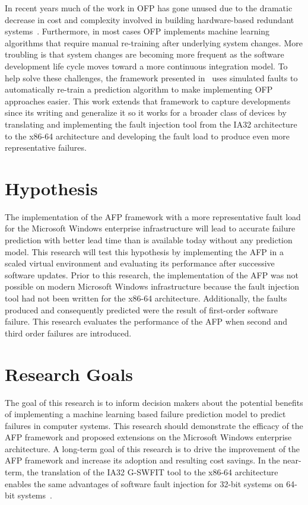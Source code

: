 In recent years much of the work in OFP has gone unused due to the dramatic
decrease in cost and complexity involved in building hardware-based redundant
systems~\cite{irrera2015}.  Furthermore, in most cases OFP implements machine
learning algorithms that require manual re-training after underlying system
changes.  More troubling is that system changes are becoming more frequent as
the software development life cycle moves toward a more continuous integration
model.  To help solve these challenges, the framework presented
in~\cite{irrera2015} uses simulated faults to automatically re-train a
prediction algorithm to make implementing OFP approaches easier.  This work
extends that framework to capture developments since its writing and generalize
it so it works for a broader class of devices by translating and implementing
the fault injection tool from the IA32 architecture to the x86-64 architecture
and developing the fault load to produce even more representative failures.

\section{Hypothesis}
The implementation of the AFP framework with a more representative fault load
for the Microsoft Windows enterprise infrastructure will lead to accurate
failure prediction with better lead time than is available today without any
prediction model.  This research will test this hypothesis by implementing the
AFP in a scaled virtual environment and evaluating its performance after
successive software updates.  Prior to this research, the implementation of the
AFP was not possible on modern Microsoft Windows infrastructure because the
fault injection tool had not been written for the x86-64 architecture.
Additionally, the faults produced and consequently predicted were the result of
first-order software failure.  This research evaluates the performance of the
AFP when second and third order failures are introduced.

\section{Research Goals}
The goal of this research is to inform decision makers about the potential
benefits of implementing a machine learning based failure prediction model to
predict failures in computer systems.  This research should demonstrate the
efficacy of the AFP framework and proposed extensions on the Microsoft Windows
enterprise architecture.  A long-term goal of this research is to drive the
improvement of the AFP framework and increase its adoption and resulting cost
savings.  In the near-term, the translation of the IA32 G-SWFIT tool to the
x86-64 architecture enables the same advantages of software fault injection for
32-bit systems on 64-bit systems~\cite{gswfit}.

